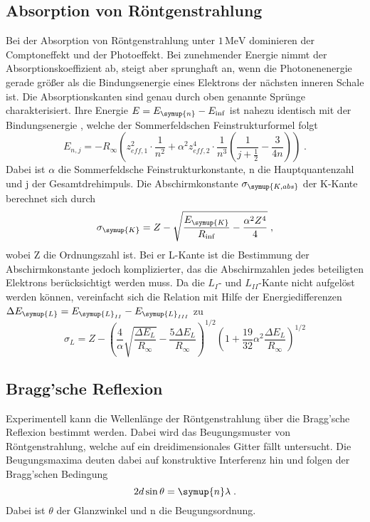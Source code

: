 \subsection{Absorption von Röntgenstrahlung}
Bei der Absorption von Röntgenstrahlung unter $1\,\text{MeV}$ dominieren der Comptoneffekt und der Photoeffekt.
Bei zunehmender Energie nimmt der Absorptionskoeffizient ab, steigt aber sprunghaft an, wenn die Photonenenergie 
gerade größer als die Bindungsenergie eines Elektrons der nächsten inneren Schale ist. 
Die Absorptionskanten sind genau durch oben 
genannte Sprünge charakterisiert. Ihre Energie $E = E_{\symup{n}} - E_{\inf}$ ist nahezu identisch mit der 
Bindungsenergie , welche der Sommerfeldschen Feinstrukturformel folgt
\begin{equation*}
    E_{n, j}=-R_{\infty}\left(z_{e f f, 1}^2 \cdot \frac{1}{n^2}+\alpha^2 z_{e f f, 2}^4 \cdot \frac{1}{n^3}\left(\frac{1}{j+\frac{1}{2}}-\frac{3}{4 n}\right)\right) \; .
\end{equation*}
Dabei ist $\alpha$ die Sommerfeldsche Feinstrukturkonstante, n die Hauptquantenzahl und j der Gesamtdrehimpuls.
Die Abschirmkonstante $\sigma_{\symup{K,abs}}$ der K-Kante berechnet sich durch 
\begin{equation*}
    \sigma_{\symup{K}} = Z - \sqrt{\frac{E_{\symup{K}}}{R_{\inf}}-\frac{\alpha^2Z^4}{4}}\; ,
\end{equation*}
wobei Z die Ordnungszahl ist.
Bei er L-Kante ist die Bestimmung der Abschirmkonstante jedoch komplizierter, das die Abschirmzahlen jedes 
beteiligten Elektrons berücksichtigt werden muss. Da die $L_{I}$- und $L_{II}$-Kante nicht aufgelöst werden 
können, vereinfacht sich die Relation mit Hilfe der Energiedifferenzen $\Delta E_{\symup{L}}= E_{\symup{L}_{II}} - E_{\symup{L}_{III}}$ zu 
\begin{equation*}
    \sigma_L=Z-\left(\frac{4}{\alpha} \sqrt{\frac{\Delta E_L}{R_{\infty}}}-\frac{5 \Delta E_L}{R_{\infty}}\right)^{1 / 2}\left(1+\frac{19}{32} \alpha^2 \frac{\Delta E_L}{R_{\infty}}\right)^{1 / 2}
\end{equation*}

\subsection{Bragg'sche Reflexion}
Experimentell kann die Wellenlänge der Röntgenstrahlung über die Bragg'sche Reflexion bestimmt werden.
Dabei wird das Beugungsmuster von Röntgenstrahlung, welche auf ein dreidimensionales Gitter fällt untersucht. 
Die Beugungsmaxima deuten dabei auf konstruktive Interferenz hin und folgen der Bragg'schen Bedingung
\begin{equation*}
    2d \sin \theta = \symup{n} \lambda \; .
\end{equation*}
Dabei ist $\theta$ der Glanzwinkel und n die Beugungsordnung.